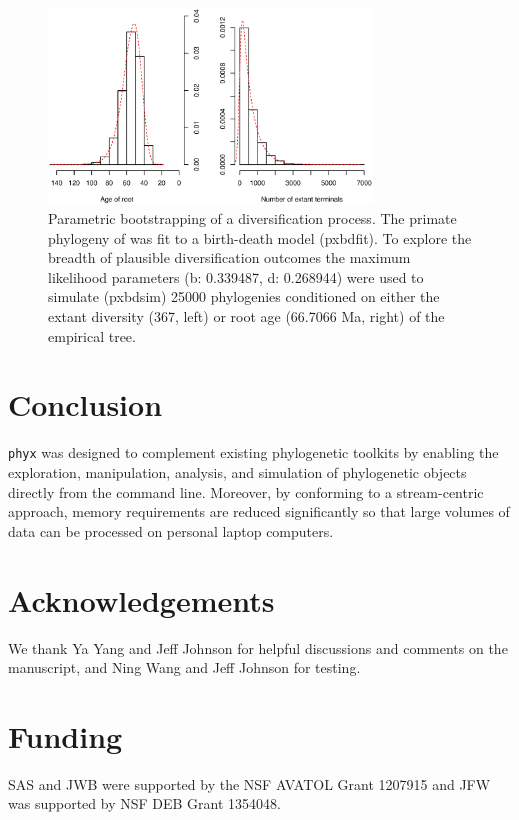 \documentclass{bioinfo}
\begin{document}
\begin{figure}[!tpb]%
\centerline{\includegraphics[width=86mm]{Fig1.eps}}
\caption{Parametric bootstrapping of a diversification process. The primate phylogeny of \cite{Springer2012} was fit to a birth-death model (pxbdfit). To explore the breadth of plausible diversification outcomes the maximum likelihood parameters (b: 0.339487, d: 0.268944) were used to simulate (pxbdsim) 25000 phylogenies conditioned on either the extant diversity (367, left) or root age (66.7066 Ma, right) of the empirical tree.}\label{fig:01}
\end{figure}


\section{Conclusion}

\texttt{phyx} was designed to complement existing phylogenetic toolkits by
enabling the exploration, manipulation, analysis, and simulation of
phylogenetic objects directly from the command line. Moreover, by conforming
to a stream-centric approach, memory requirements are reduced significantly so that large volumes of data can be processed on personal laptop
computers. \vspace*{-10pt}

\section*{Acknowledgements}

We thank Ya Yang and Jeff Johnson for helpful discussions and comments on the manuscript, and Ning Wang and Jeff Johnson for testing.\vspace*{-12pt}

\section*{Funding}

SAS and JWB were supported by the NSF AVATOL Grant 1207915 and JFW was supported by NSF DEB Grant 1354048. \vspace*{-12pt}


%
%
%
%
%
%

\end{document}
